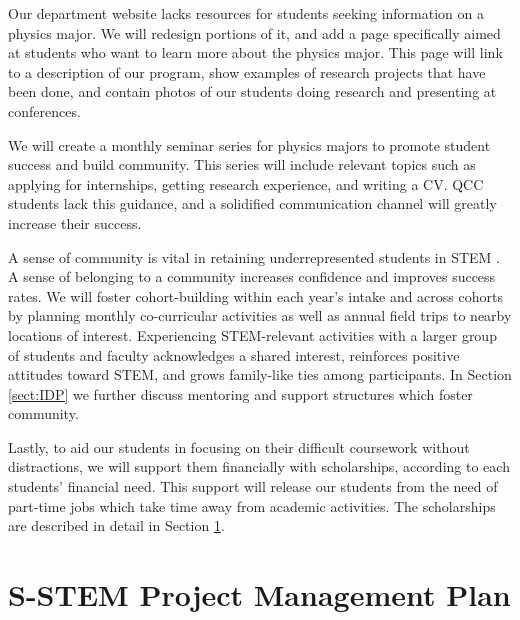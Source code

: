 \documentclass[12pt]{article}
\begin{document}
Our department website lacks resources for students seeking information on a physics major.  We will redesign portions of it, and add a page specifically aimed at students who want to learn more about the physics major.  This page will link to a description of our program, show examples of research projects that have been done, and contain photos of our students doing research and presenting at conferences.
	
We will create a monthly seminar series for physics majors to promote student success and build community.  This series will include relevant topics such as applying for internships, getting research experience, and writing a CV.  QCC students lack this guidance, and a solidified communication channel will greatly increase their success.

A sense of community is vital in retaining underrepresented students in STEM \citep[][and references therein]{NAP25257}.  A sense of belonging to a community increases confidence and improves success rates.  We will foster cohort-building within each year's intake and across cohorts by planning monthly co-curricular activities as well as annual field trips to nearby locations of interest.  Experiencing STEM-relevant activities with a larger group of students and faculty acknowledges a shared interest, reinforces positive attitudes toward STEM, and grows family-like ties among participants.  In Section \ref{sect:IDP} we further discuss mentoring and support structures which foster community.

Lastly, to aid our students in focusing on their difficult coursework without distractions, we will support them financially with scholarships, according to each students' financial need.  This support will release our students from the need of part-time jobs which take time away from academic activities.  The scholarships are described in detail in Section \ref{sect:money}.

\vspace{-6mm}


\section{S-STEM Project Management Plan}\label{sect:money}
\vspace{-3mm}
\end{document}
